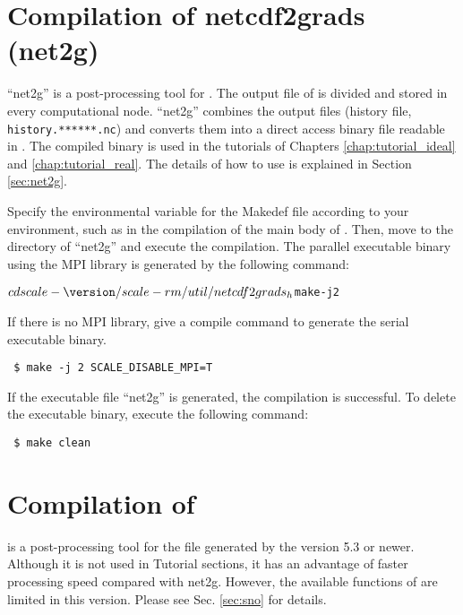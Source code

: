 \section{Compilation of netcdf2grads (net2g)} \label{sec:compile_net2g}

``net2g'' is a post-processing tool for \scalerm.
The output file of \scalerm is divided and stored in every computational node.
``net2g'' combines the output files (history file, \verb|history.******.nc|)
and converts them into a direct access binary file readable in \grads.
The compiled binary is used in the tutorials of Chapters \ref{chap:tutorial_ideal} and \ref{chap:tutorial_real}. The details of how to use is explained in Section \ref{sec:net2g}.

Specify the environmental variable for the Makedef file according to your environment,
such as in the compilation of the main body of \scalelib.
Then, move to the directory of ``net2g'' and execute the compilation. The parallel executable binary using the MPI library is generated by the following command:
\begin{alltt}
 $ cd scale-{\version}/scale-rm/util/netcdf2grads_h
 $ make -j 2
\end{alltt}
If there is no MPI library,
give a compile command to generate the serial executable binary.
\begin{verbatim}
 $ make -j 2 SCALE_DISABLE_MPI=T
\end{verbatim}
If the executable file ``net2g'' is generated, the compilation is successful.
To delete the executable binary, execute the following command:
\begin{verbatim}
 $ make clean
\end{verbatim}


\section{Compilation of \sno } \label{sec:compile_sno}

\sno is a post-processing tool for the \scalenetcdf file generated by the \scalelib version 5.3 or newer. Although it is not used in Tutorial sections, it has an advantage of faster processing speed compared with net2g. However, the available functions of \sno are limited in this version. Please see Sec. \ref{sec:sno} for details.

